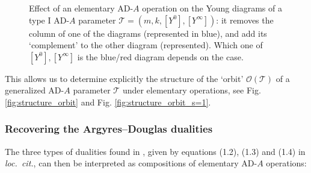 \documentclass[11pt,a4paper]{amsart}
\numberwithin{equation}{section}
\begin{document}
\begin{figure}[h]
\caption{Effect of an elementary AD-$A$ operation on the Young diagrams of a type I  AD-$A$ parameter $\mathcal T=(m,k, [Y^0], [Y^\infty])$: it removes the column of one of the diagrams (represented in blue), and add its `complement' to the other diagram (represented). Which one of $[Y^0], [Y^\infty]$ is the blue/red diagram depends on the case.}
\label{fig:elementary_operation_young_diagram}
\end{figure}


This allows us to determine explicitly the structure of the `orbit' $\mathcal O(\mathcal T)$ of a generalized AD-$A$ parameter $\mathcal T$ under elementary operations, see Fig. \ref{fig:structure_orbit} and Fig. \ref{fig:structure_orbit_s=1}.


\subsubsection{Recovering the Argyres--Douglas dualities}

The three types of dualities found in \cite{beem2025simplifying}, given by equations (1.2), (1.3) and (1.4) in \emph{loc.~cit.}, can then be interpreted as compositions of elementary AD-$A$ operations:
\end{document}
